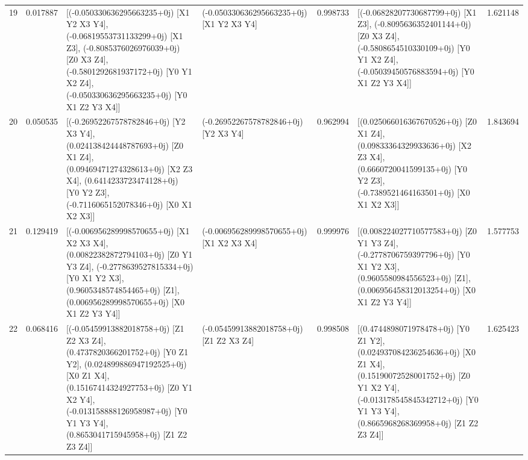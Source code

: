 \begin{tabular}{rrllrlr}
      19 &      0.017887 &                                                                                                                                                         [(-0.050330636295663235+0j) [X1 Y2 X3 Y4], (-0.06819553731133299+0j) [X1 Z3], (-0.8085376026976039+0j) [Z0 X3 Z4], (-0.5801292681937172+0j) [Y0 Y1 X2 Z4], (-0.050330636295663235+0j) [Y0 X1 Z2 Y3 X4]] &     (-0.050330636295663235+0j) [X1 Y2 X3 Y4] &      0.998733 &                                                                                                                                                               [(-0.06828207730687799+0j) [X1 Z3], (-0.8095636352401144+0j) [Z0 X3 Z4], (-0.5808654510330109+0j) [Y0 Y1 X2 Z4], (-0.05039450576883594+0j) [Y0 X1 Z2 Y3 X4]] &  1.621148 \\
      20 &      0.050535 &                                                                                                                                                                   [(-0.26952267578782846+0j) [Y2 X3 Y4], (0.024138424448787693+0j) [Z0 X1 Z4], (0.09469471274328613+0j) [X2 Z3 X4], (0.6414233723474128+0j) [Y0 Y2 Z3], (-0.7116065152078346+0j) [X0 X1 X2 X3]] &         (-0.26952267578782846+0j) [Y2 X3 Y4] &      0.962994 &                                                                                                                                                                    [(0.025066016367670526+0j) [Z0 X1 Z4], (0.09833364329933636+0j) [X2 Z3 X4], (0.6660720041599135+0j) [Y0 Y2 Z3], (-0.7389521464163501+0j) [X0 X1 X2 X3]] &  1.843694 \\
      21 &      0.129419 &                                                                                                                                                            [(-0.006956289998570655+0j) [X1 X2 X3 X4], (0.00822382872794103+0j) [Z0 Y1 Y3 Z4], (-0.2778639527815334+0j) [Y0 X1 Y2 X3], (0.9605348574854465+0j) [Z1], (0.006956289998570655+0j) [X0 X1 Z2 Y3 Y4]] &     (-0.006956289998570655+0j) [X1 X2 X3 X4] &      0.999976 &                                                                                                                                                                [(0.008224027710577583+0j) [Z0 Y1 Y3 Z4], (-0.2778706759397796+0j) [Y0 X1 Y2 X3], (0.9605580984556523+0j) [Z1], (0.006956458312013254+0j) [X0 X1 Z2 Y3 Y4]] &  1.577753 \\
      22 &      0.068416 &                                                                                                                    [(-0.05459913882018758+0j) [Z1 Z2 X3 Z4], (0.4737820366201752+0j) [Y0 Z1 Y2], (0.024899886947192525+0j) [X0 Z1 X4], (0.15167414324927753+0j) [Z0 Y1 X2 Y4], (-0.013158888126958987+0j) [Y0 Y1 Y3 Y4], (0.8653041715945958+0j) [Z1 Z2 Z3 Z4]] &      (-0.05459913882018758+0j) [Z1 Z2 X3 Z4] &      0.998508 &                                                                                                                        [(0.4744898071978478+0j) [Y0 Z1 Y2], (0.024937084236254636+0j) [X0 Z1 X4], (0.15190072528001752+0j) [Z0 Y1 X2 Y4], (-0.013178545845342712+0j) [Y0 Y1 Y3 Y4], (0.8665968268369958+0j) [Z1 Z2 Z3 Z4]] &  1.625423 \\

\end{tabular}
